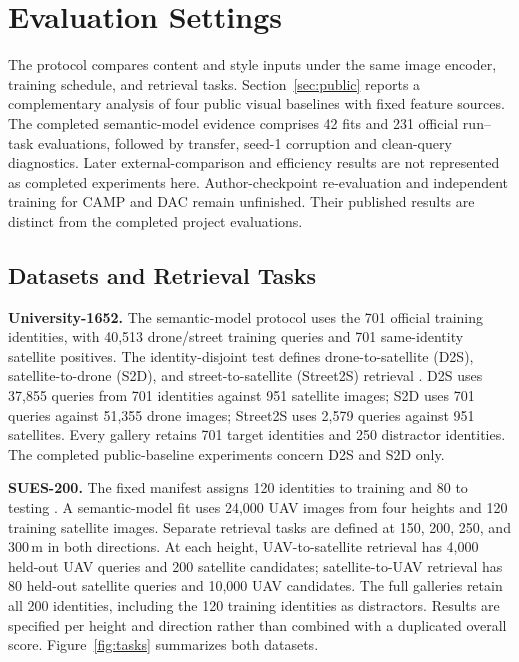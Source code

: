 \documentclass[journal]{IEEEtran}
\begin{document}
\section{Evaluation Settings}
\label{sec:protocol}

The protocol compares content and style inputs under the same image
encoder, training schedule, and retrieval tasks. Section~\ref{sec:public}
reports a complementary analysis of four public visual baselines with
fixed feature sources. The completed semantic-model evidence comprises
42 fits and 231 official run--task evaluations, followed by transfer,
seed-1 corruption and clean-query diagnostics. Later external-comparison
and efficiency results are not represented as completed experiments here.
Author-checkpoint re-evaluation and independent training for CAMP and DAC
remain unfinished. Their published results are distinct from the completed
project evaluations.

\subsection{Datasets and Retrieval Tasks}

\textbf{University-1652.} The semantic-model protocol uses the 701 official
training identities, with 40,513 drone/street training queries and 701
same-identity satellite positives. The identity-disjoint test defines
drone-to-satellite (D2S), satellite-to-drone (S2D), and street-to-satellite
(Street2S) retrieval \cite{university1652}. D2S uses 37,855 queries from 701
identities against 951 satellite images; S2D uses 701 queries against 51,355
drone images; Street2S uses 2,579 queries against 951 satellites. Every gallery
retains 701 target identities and 250 distractor identities. The completed
public-baseline experiments concern D2S and S2D only.

\textbf{SUES-200.} The fixed manifest assigns 120 identities to training and
80 to testing \cite{sues200}. A semantic-model fit uses 24,000 UAV images
from four heights and 120 training satellite images. Separate retrieval
tasks are defined at 150, 200, 250, and 300\,m in both directions. At each
height, UAV-to-satellite retrieval has 4,000 held-out UAV queries and 200
satellite candidates; satellite-to-UAV retrieval has 80 held-out satellite
queries and 10,000 UAV candidates. The full galleries retain all 200
identities, including the 120 training identities as distractors. Results
are specified per height and direction rather than combined with a
duplicated overall score. Figure~\ref{fig:tasks} summarizes both datasets.
\end{document}

